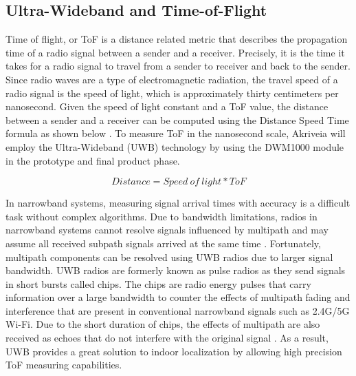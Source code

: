\subsection{Ultra-Wideband and Time-of-Flight}
\medskip
Time of flight, or ToF is a distance related metric that describes the propagation time of a radio signal between a sender and a receiver. Precisely, it is the time it takes for a radio signal to travel from a sender to receiver and back to the sender. Since radio waves are a type of electromagnetic radiation, the travel speed of a radio signal is the speed of light, which is approximately thirty centimeters per nanosecond. Given the speed of light constant and a ToF value, the distance between a sender and a receiver can be computed using the Distance Speed Time formula as shown below \cite{R2-5-1}. To measure ToF in the nanosecond scale, Akriveia will employ the Ultra-Wideband (UWB) technology by using the DWM1000 module in the prototype and final product phase.

\begin{equation*}
    Distance = Speed\:of\:light * ToF
\end{equation*}


\medskip
In narrowband systems, measuring signal arrival times with accuracy is a difficult task without complex algorithms. Due to bandwidth limitations, radios in narrowband systems cannot resolve signals influenced by multipath and may assume all received subpath signals arrived at the same time \cite{R2-5-2}. Fortunately, multipath components can be resolved using UWB radios due to larger signal bandwidth. UWB radios are formerly known as pulse radios as they send signals in short bursts called chips. The chips are radio energy pulses that carry information over a large bandwidth to counter the effects of multipath fading and interference that are present in conventional narrowband signals such as 2.4G/5G Wi-Fi. Due to the short duration of chips, the effects of multipath are also received as echoes that do not interfere with the original signal \cite{R2-5-1}. As a result, UWB provides a great solution to indoor localization by allowing high precision ToF measuring capabilities.



\pagebreak
